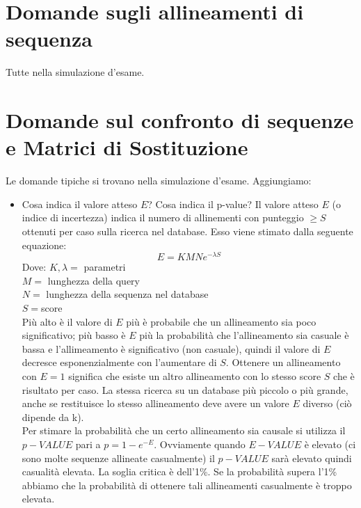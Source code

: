 \documentclass{article}
\begin{document}
\section{Domande sugli allineamenti di sequenza}
Tutte nella simulazione d'esame.
\section{Domande sul confronto di sequenze e Matrici di Sostituzione}
Le domande tipiche si trovano nella simulazione d'esame. Aggiungiamo:
\begin{itemize}
   \item Cosa indica il valore atteso $E$? Cosa indica il p-value?
   \subitem{-} Il valore atteso $E$ (o indice di incertezza) indica il numero di allinementi con punteggio $\geq S$ ottenuti per caso sulla ricerca nel database. 
   Esso viene stimato dalla seguente equazione:
   $$E=KMNe^{-\lambda S}$$
   Dove:
   $K, \lambda = $ parametri\\
   $M =$ lunghezza della query\\
   $N =$ lunghezza della sequenza nel database\\
   $S = $score\\
   Più alto è il valore di $E$ più è probabile che un allineamento sia poco significativo; più basso è $E$ più la probabilità che l'allineamento sia casuale è bassa e l'allimeamento è significativo (non casuale), quindi il valore di $E$ decresce esponenzialmente con l'aumentare di $S$. Ottenere un allineamento con $E=1$ significa che esiste un altro allineamento con lo stesso score $S$ che è risultato per caso. La stessa ricerca su un database più piccolo o più grande, anche se restituisce lo stesso allineamento deve avere un valore $E$ diverso (ciò dipende da k).\\
   Per stimare la probabilità che un certo allineamento sia causale si utilizza il $p-VALUE$ pari a $ p=1-e^{-E}$. 
   Ovviamente quando $E-VALUE$ è elevato (ci sono molte sequenze allineate casualmente) il $p-VALUE$ sarà elevato quindi casualità elevata.
   La soglia critica è dell'1\%. Se la probabilità supera l'1\% abbiamo che la probabilità di ottenere tali allineamenti casualmente è troppo elevata.
\end{itemize}
\end{document}
